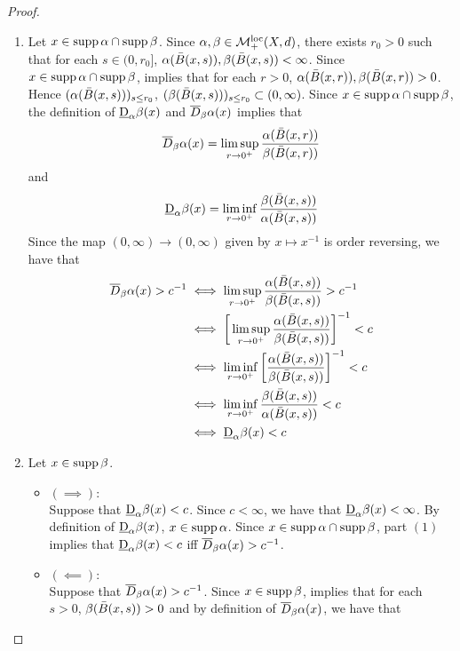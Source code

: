 \documentclass{book}
\begin{document}
	\begin{proof}\
		\begin{enumerate}
			\item Let $x \in \operatorname{supp} \alpha \cap \operatorname{supp} \beta$. Since $\alpha, \beta \in \mathcal{M}_+^{\text{loc}}(X, d)$, there exists $r_0 >0$ such that for each $s \in (0,r_0]$, $\alpha(\bar{B}(x, s)), \beta(\bar{B}(x, s)) < \infty$. Since $x \in \operatorname{supp} \alpha \cap \operatorname{supp} \beta$,  implies that for each $r > 0$, $\alpha(\bar{B}(x, r)), \beta(\bar{B}(x, r)) > 0$. Hence $(\alpha(\bar{B}(x, s)))_{s \leq r_0}$, $(\beta(\bar{B}(x, s)))_{s \leq r_0} \subset (0,\infty)$. Since $x \in \operatorname{supp} \alpha \cap \operatorname{supp} \beta$, the definition of $\underbar{D}_{\alpha} \beta (x)$ and $\overline{D}_{\beta}\alpha(x)$ implies that 
			$$\overline{D}_{\beta}\alpha(x) = \limsup\limits_{r \rightarrow 0^+} \frac{\alpha(\bar{B}(x, r))}{\beta(\bar{B}(x, r))}$$ 
			and 
			$$\underbar{D}_{\alpha} \beta (x) = \liminf\limits_{r \rightarrow 0^+} \frac{\beta(\bar{B}(x, s))}{\alpha(\bar{B}(x, s))}$$ 
			Since the map $(0, \infty) \rightarrow (0, \infty)$ given by $x \mapsto x^{-1}$ is order reversing, we have that
			\begin{align*}
				\overline{D}_{\beta}\alpha(x) > c^{-1}
				& \iff \limsup_{r \rightarrow 0^+} \frac{\alpha(\bar{B}(x, s))}{\beta(\bar{B}(x, s))} > c^{-1} \\
				& \iff \bigg[ \limsup_{r \rightarrow 0^+} \frac{\alpha(\bar{B}(x, s))}{\beta(\bar{B}(x, s))} \bigg]^{-1}  <  c \\
				& \iff \liminf_{r \rightarrow 0^+} \bigg[ \frac{\alpha(\bar{B}(x, s))}{\beta(\bar{B}(x, s))} \bigg]^{-1}  <  c \\
				& \iff  \liminf_{r \rightarrow 0^+} \frac{\beta(\bar{B}(x, s))}{\alpha(\bar{B}(x, s))}  < c \\
				& \iff \underbar{D}_{\alpha} \beta (x) < c
			\end{align*}
			\item Let $x \in \operatorname{supp} \beta$.
			\begin{itemize}
				\item $(\implies):$ \\
				Suppose that $\underbar{D}_{\alpha} \beta (x) < c$. Since $c < \infty$, we have that $\underbar{D}_{\alpha} \beta (x) < \infty$. By definition of $\underbar{D}_{\alpha} \beta (x)$, $x \in \operatorname{supp} \alpha$. Since $x \in \operatorname{supp} \alpha \cap \operatorname{supp} \beta$, part $(1)$ implies that $\underbar{D}_{\alpha} \beta (x) < c$ iff $\overline{D}_{\beta}\alpha(x) > c^{-1}$.
				\item $(\impliedby):$ \\
				Suppose that $\overline{D}_{\beta}\alpha(x) > c^{-1}$. Since $x \in \operatorname{supp} \beta$,  implies that for each $s > 0$, $\beta(\bar{B}(x, s)) > 0$ and by definition of $\overline{D}_{\beta}\alpha (x)$, we have that

\end{itemize}
\end{enumerate}
\end{proof}
\end{document}
